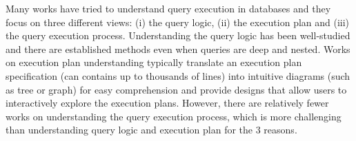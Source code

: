 

Many works have tried to understand query execution in databases and they focus on three different views: (i) the query logic, (ii) the execution plan and (iii) the query execution process. Understanding the query logic has been well-studied and there are established methods even when queries are deep and nested. Works on execution plan understanding typically translate an execution plan specification (can contains up to thousands of lines) into intuitive diagrams (such as tree or graph) for easy comprehension and provide designs that allow users to interactively explore the execution plans. However, there are relatively fewer works on understanding the query execution process, which is more challenging than understanding query logic and execution plan for the 3 reasons.      


